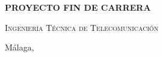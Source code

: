 \begin{spacing}{1}
\begin{titlepage}
	\bigskip
	
	\begin{center}\Large\textbf{\textsf{PROYECTO FIN DE CARRERA}}\end{center}
	
	\medskip
	
	\begin{center}
		\Huge
		\sffamily\scshape
		\pfctitlename
	\end{center}
	
	\medskip
	
	\begin{center}
		\Huge
		\scshape%
		\textsf{Ingeniería Técnica de Telecomunicación}
	\end{center}
	
	\vfill
	
	{\large Málaga, \pfcanno \hfill \pfcauthorname}
	\blankpage
\end{titlepage}
\end{spacing}